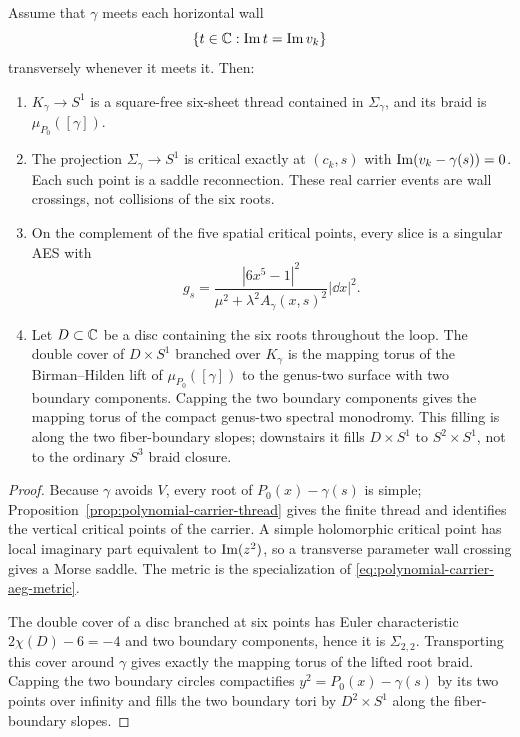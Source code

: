 \begin{proposition}
\label{prop:sextic-carrier-thread-spectral}
Assume that $\gamma$ meets each horizontal wall
\begin{equation}
 \{t\in\mathbb{C}:\operatorname{Im} t=\operatorname{Im} v_k\}
 \label{eq:sextic-real-critical-walls}
\end{equation}
transversely whenever it meets it.  Then:
\begin{enumerate}
\item $K_\gamma\to S^1$ is a square-free six-sheet thread contained in
  $\Sigma_\gamma$, and its braid is $\mu_{P_0}([\gamma])$.
\item The projection $\Sigma_\gamma\to S^1$ is critical exactly at
  $(c_k,s)$ with $\operatorname{Im}(v_k-\gamma(s))=0$.  Each such point is a saddle
  reconnection.  These real carrier events are wall crossings, not collisions
  of the six roots.
\item On the complement of the five spatial critical points, every slice is a
  singular AES with
  \begin{equation}
   g_s=
   \frac{|6x^5-1|^2}
        {\mu^2+\lambda^2A_\gamma(x,s)^2}|\dd x|^2.
   \label{eq:sextic-aeg-slice-metric}
  \end{equation}
\item Let $D\subset\mathbb{C}$ be a disc containing the six roots throughout the
  loop.  The double cover of $D\times S^1$ branched over $K_\gamma$ is the
  mapping torus of the Birman--Hilden lift of
  $\mu_{P_0}([\gamma])$ to the genus-two surface with two boundary
  components.  Capping the two boundary components gives the mapping torus of
  the compact genus-two spectral monodromy.  This filling is along the two
  fiber-boundary slopes; downstairs it fills $D\times S^1$ to
  $S^2\times S^1$, not to the ordinary $S^3$ braid closure.
\end{enumerate}
\end{proposition}

\begin{proof}
Because $\gamma$ avoids $V$, every root of $P_0(x)-\gamma(s)$ is simple;
Proposition~\ref{prop:polynomial-carrier-thread} gives the finite thread and
identifies the vertical critical points of the carrier.  A simple holomorphic
critical point has local imaginary part equivalent to $\operatorname{Im}(z^2)$, so a
transverse parameter wall crossing gives a Morse saddle.  The metric is the
specialization of \eqref{eq:polynomial-carrier-aeg-metric}.

The double cover of a disc branched at six points has Euler characteristic
$2\chi(D)-6=-4$ and two boundary components, hence it is $\Sigma_{2,2}$.
Transporting this cover around $\gamma$ gives exactly the mapping torus of the
lifted root braid.  Capping the two boundary circles compactifies
$y^2=P_0(x)-\gamma(s)$ by its two points over infinity and fills the two
boundary tori by $D^2\times S^1$ along the fiber-boundary slopes.
\end{proof}

